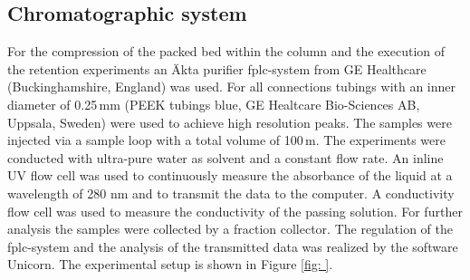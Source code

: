 % 
% 
%         


\subsection{Chromatographic system}
\label{subsec:chrom_sys}
For the compression of the packed bed within the column and the execution of the retention experiments an Äkta purifier \gls{fplc}-system from GE Healthcare (Buckinghamshire, England) was used. For all connections tubings with an inner diameter of 0.25\,mm (PEEK tubings blue, GE Healtcare Bio-Sciences AB, Uppsala, Sweden) were used to achieve high resolution peaks. The samples were injected via a sample loop with a total volume of 100\,\textmu m. The experiments were conducted with ultra-pure water as solvent and a constant flow rate. An inline UV flow cell was used to continuously measure the absorbance of the liquid at a wavelength of 280 nm and to transmit the data to the computer. A conductivity flow cell was used to measure the conductivity of the passing solution. For further analysis the samples were collected by a fraction collector. The regulation of the \gls{fplc}-system and the analysis of the transmitted data was realized by the software Unicorn. The experimental setup is shown in Figure \ref{fig:  }.

